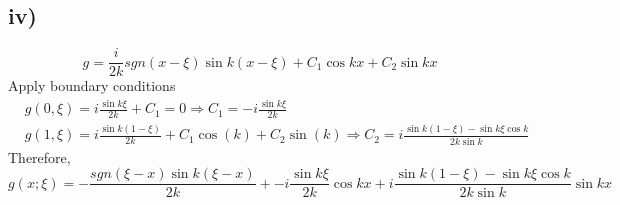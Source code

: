 \documentclass[a4paper, 11pt]{article}
\begin{document}
\begin{spacing}{1.5}
\subsection*{iv)}
$$
    g = \frac{i}{2k} sgn(x-\xi) \sin k(x-\xi) + C_1\cos kx + C_2\sin kx
$$
Apply boundary conditions
\begin{align*}
& g(0,\xi) = i\frac{\sin k\xi}{2k} + C_1 = 0  \Rightarrow C_1=-i\frac{\sin k\xi}{2k}\\
& g(1,\xi) = i\frac{\sin k(1-\xi)}{2k} + C_1 \cos(k) + C_2 \sin(k) \Rightarrow C_2 =i \frac{\sin k(1-\xi) - \sin k\xi \cos k}{2k\sin k}
\end{align*}
Therefore,
$$
    g(x;\xi) = -\frac{sgn(\xi-x) \sin k(\xi-x)}{2k} + -i\frac{\sin k\xi}{2k} \cos kx +i \frac{\sin k(1-\xi) - \sin k\xi \cos k}{2k\sin k}\sin kx
$$




\end{spacing}
\end{document}
